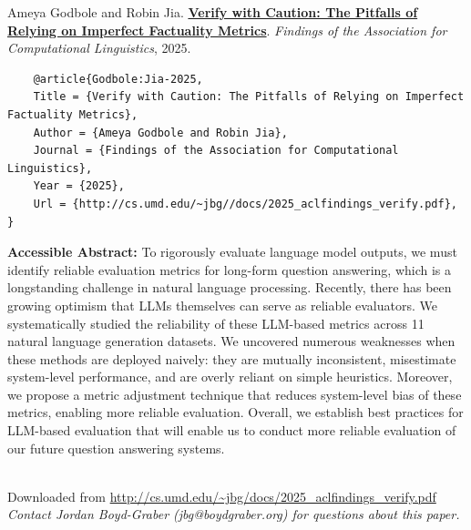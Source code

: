 \documentclass[a4paper]{article}
\begin{document}
    Ameya Godbole and Robin Jia.  {\bf \href{http://cs.umd.edu/~jbg//docs/2025_aclfindings_verify.pdf}{Verify with Caution: The Pitfalls of Relying on Imperfect Factuality Metrics}}.  \emph{Findings of the Association for Computational Linguistics}, 2025.



    \vspace{5cm}

    \begin{verbatim}
    @article{Godbole:Jia-2025,
	Title = {Verify with Caution: The Pitfalls of Relying on Imperfect Factuality Metrics},
	Author = {Ameya Godbole and Robin Jia},
	Journal = {Findings of the Association for Computational Linguistics},
	Year = {2025},
	Url = {http://cs.umd.edu/~jbg//docs/2025_aclfindings_verify.pdf},
}

    \end{verbatim}

    {\bf Accessible Abstract:} To rigorously evaluate language model outputs, we must identify reliable evaluation metrics for long-form question answering, which is a longstanding challenge in natural language processing. Recently, there has been growing optimism that LLMs themselves can serve as reliable evaluators. We systematically studied the reliability of these LLM-based metrics across 11 natural language generation datasets. We uncovered numerous weaknesses when these methods are deployed naively: they are mutually inconsistent, misestimate system-level performance, and are overly reliant on simple heuristics. Moreover, we propose a metric adjustment technique that reduces system-level bias of these metrics, enabling more reliable evaluation. Overall, we establish best practices for LLM-based evaluation that will enable us to conduct more reliable evaluation of our future question answering systems.\\~

    

    

    \vspace{3cm}
    Downloaded from \url{http://cs.umd.edu/~jbg/docs/2025_aclfindings_verify.pdf}  \\

    \vspace{2cm}
    \textit{Contact Jordan Boyd-Graber (jbg@boydgraber.org) for questions about this paper.}

    

    
\end{document}
